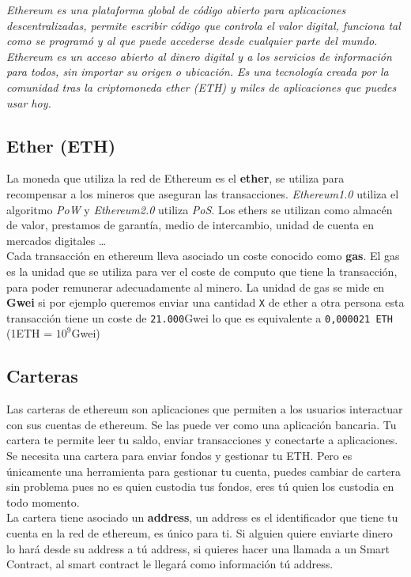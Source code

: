 \textit{Ethereum es una plataforma global de código abierto para aplicaciones descentralizadas, permite escribir código que controla el valor digital, funciona tal como se programó y al que puede accederse desde cualquier parte del mundo. Ethereum es un acceso abierto al dinero digital y a los servicios de información para todos, sin importar su origen o ubicación. Es una tecnología creada por la comunidad tras la criptomoneda ether (ETH) y miles de aplicaciones que puedes usar hoy.}

\subsection{Ether (ETH)}
La moneda que utiliza la red de Ethereum es el \textbf{ether}, se utiliza para recompensar a los mineros que aseguran las transacciones. \emph{Ethereum1.0} utiliza el algoritmo \textit{PoW} y \emph{Ethereum2.0} utiliza \textit{PoS}\cite{Ethereum2.0}. Los ethers se utilizan como almacén de valor, prestamos de garantía, medio de intercambio, unidad de cuenta en mercados digitales \dots \\

Cada transacción en ethereum lleva asociado un coste conocido como \textbf{gas}. El gas es la unidad que se utiliza para ver el coste de computo que tiene la transacción, para poder remunerar adecuadamente al minero. La unidad de gas se mide en \textbf{Gwei}\cite{Gwei} si por ejemplo queremos enviar una cantidad \verb|X| de ether a otra persona esta transacción tiene un coste de \verb|21.000|Gwei lo que es equivalente a \verb|0,000021 ETH| (1ETH = $10^9$Gwei)

\subsection{Carteras}

Las carteras de ethereum son aplicaciones que permiten a los usuarios interactuar con sus cuentas de ethereum. Se las puede ver como una aplicación bancaria. Tu cartera te permite leer tu saldo, enviar transacciones y conectarte a aplicaciones. Se necesita una cartera para enviar fondos y gestionar tu ETH. Pero es únicamente una herramienta para gestionar tu cuenta, puedes cambiar de cartera sin problema pues no es quien custodia tus fondos, eres tú quien los custodia en todo momento. \\

La cartera tiene asociado un \textbf{address}, un address es el identificador que tiene tu cuenta en la red de ethereum, es único para ti. Si alguien quiere enviarte dinero lo hará desde su address a tú address, si quieres hacer una llamada a un Smart Contract, al smart contract le llegará como información tú address. \\

